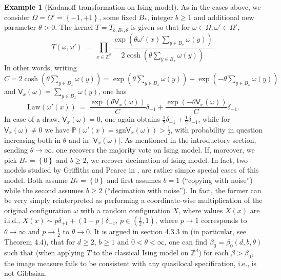 \documentclass[12pt]{article}
\renewcommand{\P}{\mathbb{P}}
\newcommand{\Z}{\mathbb{Z}}
\newcommand{\set}[1]{\left\{#1\right\}}
\newcommand{\ra}{\rightarrow}
\newcommand{\1}{\mathbbm{1}}
\newcommand{\5}{\vspace{0.5cm}}
\theoremstyle{definition}
\newtheorem{ex}[thm]{Example}
\begin{document}
\begin{ex}[Kadanoff transformation on Ising model] As in the cases above, we consider $\Omega=\Omega'=\set{-1,+1}$, some fixed $B_*$, integer $b\geq 1$ and additional new parameter $\theta>0$. The kernel $T=T_{b,B_*,\theta}$ is given so that for $\omega\in\Omega,\omega'\in\Omega'$, 
$$T(\omega,\omega') ~=~ \prod_{x\in\Z^d}\frac{\exp(\theta\omega'(x)\sum_{y\in B_x}\omega(y))}{2\cosh(\theta\sum_{y\in B_x}\omega(y))}.$$
In other words, writing $C=2\cosh(\theta\sum_{y\in B_x}\omega(y))=\exp(\theta\sum_{y\in B_x}\omega(y))+\exp(-\theta\sum_{y\in B_x}\omega(y))$ and $\mathsf{V}_x(\omega)=\sum_{y\in B_x}\omega(y)$, one has
$$\mathrm{Law}(\omega'(x)) ~=~ \frac{\exp(\theta\mathsf{V}_x(\omega))}{C}\delta_{+1}+\frac{\exp(-\theta\mathsf{V}_x(\omega))}{C}\delta_{-1}.$$
In case of a draw, $\mathsf{V}_x(\omega)=0$, one again obtains $\frac{1}{2}\delta_{+1}+\frac{1}{2}\delta_{-1}$, while for $\mathsf{V}_x(\omega)\neq 0$ we have $\P(\omega'(x)=\mathrm{sgn}\mathsf{V}_x(\omega))>\frac{1}{2}$, with probability in question increasing both in $\theta$ and in $|\mathsf{V}_x(\omega)|$. As mentioned in the introductory section, sending $\theta\ra\infty$, one recovers the majority vote on Ising model. If, moreover, we pick $B_*=\set{0}$ and $b\geq 2$, we recover decimation of Ising model. In fact, two models studied by Griffiths and Pearce in \cite{GP1}, \cite{GP2} are rather simple special cases of this model. Both assume $B_*=\set{0}$ and first assumes $b=1$ (``copying with noise'') while the second assumes $b\geq 2$ (``decimation with noise''). In fact, the former can be very simply reinterpreted as performing a coordinate-wise multiplication of the original configuration $\omega$ with a random configuration $X$, where values $X(x)$ are i.i.d., $X(x)\sim p\delta_{+1}+(1-p)\delta_{-1}$, $p\in(\frac{1}{2},1)$, where $p\ra 1$ corresponds to $\theta\ra\infty$ and $p\ra \frac{1}{2}$ to $\theta \ra 0$. It is argued in section 4.3.3 in \cite{EFS} (in particular, see Theorem 4.4), that for $d\geq 2$, $b\geq 1$ and $0<\theta<\infty$, one can find $\beta_0=\beta_0(d,b,\theta)$ such that (when applying $T$ to the classical Ising model on $\Z^d$) for each $\beta>\beta_0$, the image measure fails to be consistent with any quasilocal specification, i.e., is not Gibbsian.
\end{ex}


\pagebreak

\end{document}
